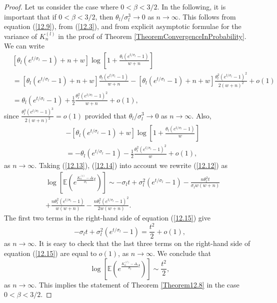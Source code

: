 \documentclass[12pt]{amsart}
\theoremstyle{definition}
\numberwithin{equation}{section}
\begin{document}
\begin{proof}
Let us consider the case where $0<\beta<3/2$.
In the following, it is important that if $0<\beta<3/2$, then $\theta_l/\sigma_l^3\rightarrow 0$
as $n\rightarrow\infty$. This follows from equation (\ref{12.9}), from
(\ref{12.3}), and from explicit asymptotic formulae for the variance of $K_n^{(l)}$ in the proof of Theorem \ref{TheoremConvergenceInProbability}.
We can write
\begin{equation}\label{12.13}
\begin{split}
&\left[\theta_l\left(e^{t/\sigma_l}-1\right)+n+w\right]
\log\left[1+\frac{\theta_l\left(e^{t/\sigma_l}-1\right)}{w+n}\right]\\
&=\left[\theta_l\left(e^{t/\sigma_l}-1\right)+n+w\right]
\frac{\theta_l\left(e^{t/\sigma_l}-1\right)}{w+n}-\left[\theta_l\left(e^{t/\sigma_l}-1\right)+n+w\right]
\frac{\theta_l^2\left(e^{t/\sigma_l}-1\right)^2}{2(w+n)^2}+o(1)\\
&=\theta_l\left(e^{t/\sigma_l}-1\right)+\frac{1}{2}\frac{\theta_l^2\left(e^{t/\sigma_l}-1\right)^2}{w+n}+o(1),
\end{split}
\end{equation}
since $\frac{\theta_l^3(e^{t/\sigma_l}-1)^3}{2(w+n)^2}=o(1)$
provided that $\theta_l/\sigma_l^3\rightarrow 0$
as $n\rightarrow\infty$.
Also,
\begin{equation}\label{12.14}
\begin{split}
&-\left[\theta_l\left(e^{t/\sigma_l}-1\right)+w\right]
\log\left[1+\frac{\theta_l\left(e^{t/\sigma_l}-1\right)}{w}\right]\\
&=-\theta_l\left(e^{t/\sigma_l}-1\right)-\frac{1}{2}\frac{\theta_l^2\left(e^{t/\sigma_l}-1\right)^2}{w}+o(1),
\end{split}
\end{equation}
as $n\rightarrow\infty$. Taking (\ref{12.13}), (\ref{12.14})
into account we rewrite (\ref{12.12}) as
\begin{equation}\label{12.15}
\begin{split}
&\log\left[\mathbb{E}\left(e^{\frac{K_n^{(l)}-\Delta_l}{\sigma_l}t}\right)\right]
\sim-\sigma_l t
+\sigma_l^2\left(e^{t/\sigma_l}-1\right)-\frac{n\theta_l^2t}{\sigma_l w(w+n)}\\
&+\frac{n\theta^2_l\left(e^{t/\sigma_l}-1\right)}{w(w+n)}
-\frac{n\theta^2_l\left(e^{t/\sigma_l}-1\right)^2}{2w(w+n)}.
\end{split}
\end{equation}
The first two terms in the right-hand side of equation (\ref{12.15}) give
\begin{equation}
-\sigma_l t
+\sigma_l^2\left(e^{t/\sigma_l}-1\right)=\frac{t^2}{2}+o(1),
\end{equation}
as $n\rightarrow\infty$. It is easy to check that the last three terms on the right-hand side of equation (\ref{12.15}) are equal to $o(1)$, as $n\rightarrow\infty$. We conclude that
\begin{equation}\label{LogGeneration}
\log\left[\mathbb{E}\left(e^{\frac{K_n^{(l)}-\Delta_l}{\sigma_l}t}\right)\right]
\sim \frac{t^2}{2},
\end{equation}
as $n\rightarrow\infty$. This implies the statement of Theorem
\ref{Theorem12.8} in the case $0<\beta<3/2$.


\end{proof}
\end{document}
